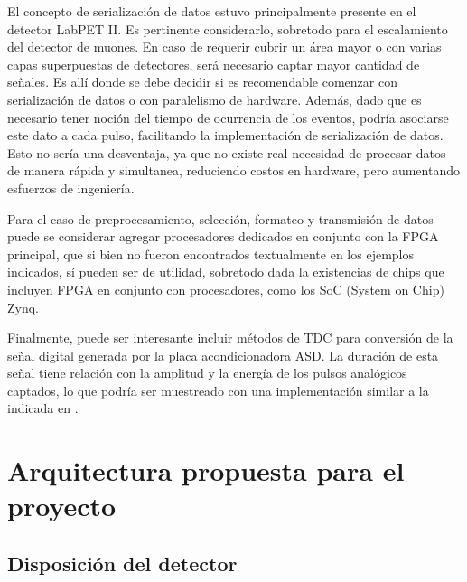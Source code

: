 \par El concepto de serialización de datos estuvo principalmente presente en el detector LabPET II. Es pertinente considerarlo, sobretodo para el escalamiento del detector de muones. En caso de requerir cubrir un área mayor o con varias capas superpuestas de detectores, será necesario captar mayor cantidad de señales. Es allí donde se debe decidir si es recomendable comenzar con serialización de datos o con paralelismo de hardware. Además, dado que es necesario tener noción del tiempo de ocurrencia de los eventos, podría asociarse este dato a cada pulso, facilitando la implementación de serialización de datos. Esto no sería una desventaja, ya que no existe real necesidad de procesar datos de manera rápida y simultanea, reduciendo costos en hardware, pero aumentando esfuerzos de ingeniería.

\par Para el caso de preprocesamiento, selección, formateo y transmisión de datos puede se considerar agregar procesadores dedicados en conjunto con la FPGA principal, que si bien no fueron encontrados textualmente en los ejemplos indicados, sí pueden ser de utilidad, sobretodo dada la existencias de chips que incluyen FPGA en conjunto con procesadores, como los SoC (System on Chip) Zynq.

\par Finalmente, puede ser interesante incluir métodos de TDC para conversión de la señal digital generada por la placa acondicionadora ASD. La duración de esta señal tiene relación con la amplitud y la energía de los pulsos analógicos captados, lo que podría ser muestreado con una implementación similar a la indicada en \cite{Arpin2010AResources}.


\section{Arquitectura propuesta para el proyecto}\label{sec:arqui_propuesta}
\subsection{Disposición del detector}\label{sec:orga_detector}
